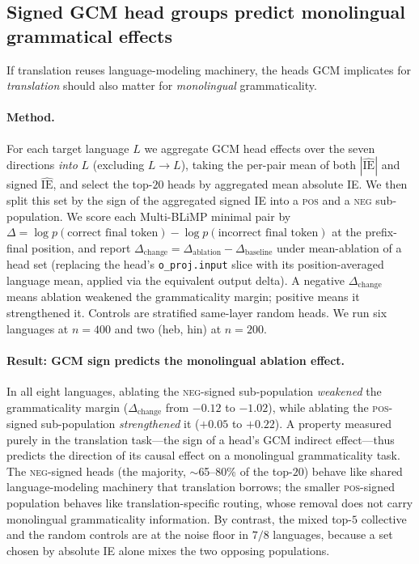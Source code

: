 \documentclass[11pt]{article}
\begin{document}
\subsection{Signed GCM head groups predict monolingual grammatical effects}
\label{sec:gcm-ablate}

If translation reuses language-modeling machinery, the heads GCM implicates for
\emph{translation} should also matter for \emph{monolingual} grammaticality.

\paragraph{Method.} For each target language $L$ we aggregate GCM head effects
over the seven directions \emph{into} $L$ (excluding $L\!\to\!L$), taking the
per-pair mean of both $|\widehat{\mathrm{IE}}|$ and signed
$\widehat{\mathrm{IE}}$, and select the top-$20$ heads by aggregated mean
absolute IE. We then split this set by the sign of the aggregated signed IE into
a \textsc{pos} and a \textsc{neg} sub-population. We score each Multi-BLiMP
minimal pair by $\Delta = \log p(\text{correct final token}) -
\log p(\text{incorrect final token})$ at the prefix-final position, and report
$\Delta_{\text{change}} = \Delta_{\text{ablation}} - \Delta_{\text{baseline}}$
under mean-ablation of a head set (replacing the head's \texttt{o\_proj.input}
slice with its position-averaged language mean, applied via the equivalent
output delta). A negative $\Delta_{\text{change}}$ means ablation weakened the
grammaticality margin; positive means it strengthened it. Controls are
stratified same-layer random heads. We run six languages at $n{=}400$ and two
(heb, hin) at $n{=}200$.

\paragraph{Result: GCM sign predicts the monolingual ablation effect.} In all
eight languages, ablating the \textsc{neg}-signed sub-population
\emph{weakened} the grammaticality margin ($\Delta_{\text{change}}$ from $-0.12$
to $-1.02$), while ablating the \textsc{pos}-signed sub-population
\emph{strengthened} it ($+0.05$ to $+0.22$). A property measured purely in the
translation task---the sign of a head's GCM indirect effect---thus predicts the
direction of its causal effect on a monolingual grammaticality task. The
\textsc{neg}-signed heads (the majority, $\sim$65--80\% of the top-$20$) behave
like shared language-modeling machinery that translation borrows; the smaller
\textsc{pos}-signed population behaves like translation-specific routing, whose
removal does not carry monolingual grammaticality information. By contrast, the
mixed top-$5$ collective and the random controls are at the noise floor in
$7/8$ languages, because a set chosen by absolute IE alone mixes the two
opposing populations.
\end{document}
